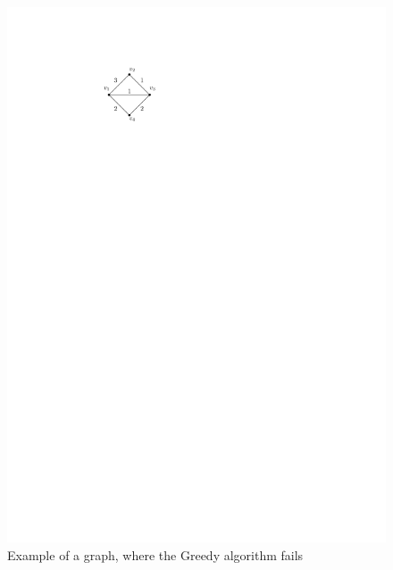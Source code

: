 \documentclass[runningheads]{llncs}
\numberwithin{equation}{section}
\begin{document}
\begin{figure}[htpb]
\centering
\includegraphics[scale=1]{img/greedy-incorrect}
\caption{Example of a graph, where the Greedy algorithm fails}
\label{fig_greedy_fail}
\end{figure}
\end{document}
